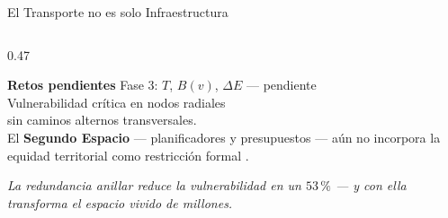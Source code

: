 \begin{frame}{El Transporte no es solo Infraestructura}
\begin{columns}[T]
\begin{column}{0.47\textwidth}
\begin{alertblock}{\scriptsize\bfseries Retos pendientes}
        {\scriptsize
          Fase 3: $T$, $B(v)$, $\Delta E$ — pendiente\\[0.04cm]
          Vulnerabilidad crítica en nodos radiales\\
          sin caminos alternos transversales.\\[0.09cm]
          {\tiny\color{ColorPrincipal}
            El \textbf{Segundo Espacio} — planificadores
            y presupuestos — aún no incorpora
            la equidad territorial como restricción
            formal \citep{lefebvre2013produccion}.}%
        }
      \end{alertblock}
      \vspace{0.08cm}
      {\tiny\itshape\color{gray!60}
        La redundancia anillar reduce la vulnerabilidad
        en un $53\,\text{\%}$ — y con ella transforma
        el espacio vivido de millones.}
    \end{column}
  \end{columns}
\end{frame}

